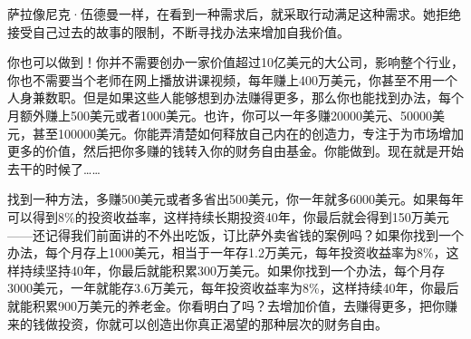 萨拉像尼克·伍德曼一样，在看到一种需求后，就采取行动满足这种需求。她拒绝接受自己过去的故事的限制，不断寻找办法来增加自我价值。

你也可以做到！你并不需要创办一家价值超过10亿美元的大公司，影响整个行业，你也不需要当个老师在网上播放讲课视频，每年赚上400万美元，你甚至不用一个人身兼数职。但是如果这些人能够想到办法赚得更多，那么你也能找到办法，每个月额外赚上500美元或者1000美元。也许，你可以一年多赚20000美元、50000美元，甚至100000美元。你能弄清楚如何释放自己内在的创造力，专注于为市场增加更多的价值，然后把你多赚的钱转入你的财务自由基金。你能做到。现在就是开始去干的时候了……

找到一种方法，多赚500美元或者多省出500美元，你一年就多6000美元。如果每年可以得到8\%的投资收益率，这样持续长期投资40年，你最后就会得到150万美元——还记得我们前面讲的不外出吃饭，订比萨外卖省钱的案例吗？如果你找到一个办法，每个月存上1000美元，相当于一年存1.2万美元，每年投资收益率为8\%，这样持续坚持40年，你最后就能积累300万美元。如果你找到一个办法，每个月存3000美元，一年就能存3.6万美元，每年投资收益率为8\%，这样持续40年，你最后就能积累900万美元的养老金。你看明白了吗？去增加价值，去赚得更多，把你赚来的钱做投资，你就可以创造出你真正渴望的那种层次的财务自由。
